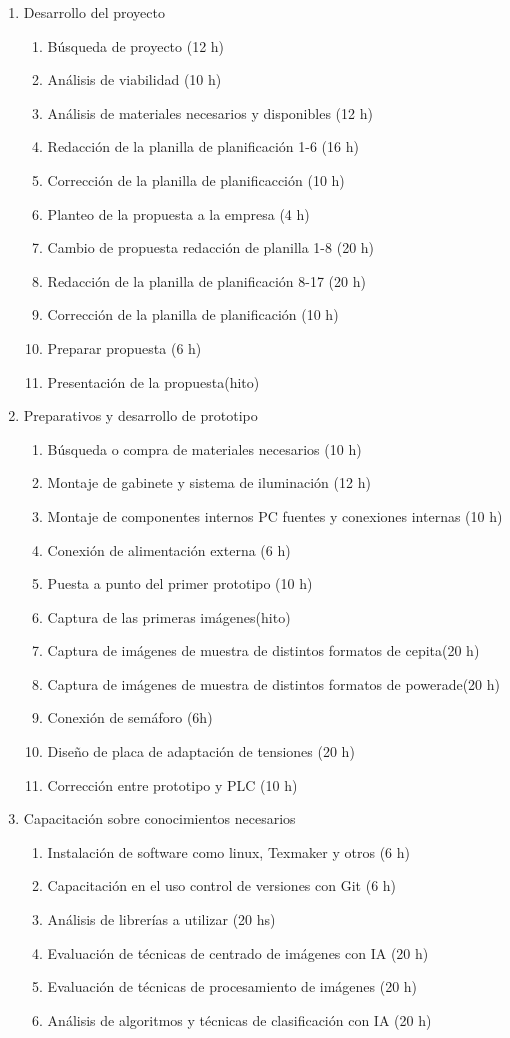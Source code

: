 \documentclass[11pt]{charter}
\begin{document}
\begin{enumerate}
\item Desarrollo del proyecto 
	\begin{enumerate}
	\item Búsqueda de proyecto (12 h)
	\item Análisis de viabilidad (10 h)
	\item Análisis de materiales necesarios y disponibles (12 h)
	\item Redacción de la planilla de planificación 1-6 (16 h)
	\item Corrección de la planilla de planificacción (10 h)
	\item Planteo de la propuesta a la empresa (4 h)
	\item Cambio de propuesta redacción de planilla 1-8 (20 h)
	\item Redacción de la planilla de planificación 8-17 (20 h)
	\item Corrección de la planilla de planificación (10 h)
	\item Preparar propuesta (6 h)
	\item Presentación de la propuesta(hito)
	\end{enumerate}
\item Preparativos y desarrollo de prototipo
\begin{enumerate}
	\item Búsqueda o compra de materiales necesarios (10 h)
	\item Montaje de gabinete y sistema de iluminación (12 h)
	\item Montaje de componentes internos PC fuentes y conexiones internas (10 h)
	\item Conexión de alimentación externa (6 h)
	\item Puesta a punto del primer prototipo (10 h)
	\item Captura de las primeras imágenes(hito)
	\item Captura de imágenes de muestra de distintos formatos de cepita(20 h) 
	\item Captura de imágenes de muestra de distintos formatos de powerade(20 h)
	\item Conexión de semáforo (6h)
	\item Diseño de placa de adaptación de tensiones (20 h)
	\item Corrección entre prototipo y PLC (10 h)
	\end{enumerate}
\item Capacitación sobre conocimientos necesarios
	\begin{enumerate}
	\item Instalación de software como linux, Texmaker y otros (6 h)
	\item Capacitación en el uso control de versiones con Git (6 h)
	\item Análisis de librerías a utilizar (20 hs)
	\item Evaluación de técnicas de centrado de imágenes con IA (20 h) 
	\item Evaluación de técnicas de procesamiento de imágenes (20 h)
	\item Análisis de algoritmos y técnicas de clasificación con IA (20 h)


\end{enumerate}
\end{enumerate}
\end{document}
